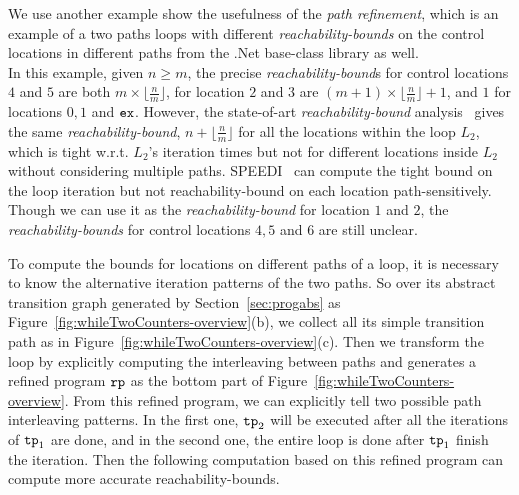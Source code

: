 \begin{example}
  \label{ex:twoCounterWhile}
  
  We use another example show the usefulness of the \emph{path refinement}, which is an example of a two paths loops
  with different \emph{reachability-bounds} on the control locations in different paths from the .Net base-class library as well.
  \\
In this example, given $n \geq m$,
the precise \emph{reachability-bound}s for control locations $4$ and $5$ are both $m \times \lfloor\frac{n}{m}\rfloor$,
for location $2$ and $3$ are $(m + 1) \times \lfloor\frac{n}{m}\rfloor + 1$, 
and $1$ for locations $0, 1$ and $\mathtt{ex}$. 
However, the state-of-art \emph{reachability-bound} analysis~\cite{GulwaniZ10}
gives the same \emph{reachability-bound}, $n + \lfloor\frac{n}{m}\rfloor$ for all the locations within the loop $L_2$, which is tight w.r.t. $L_2$'s iteration times but not for different locations inside $L_2$ without considering multiple paths.
SPEEDI~\cite{GulwaniJK09} can compute the tight bound on the loop iteration but not reachability-bound on each location path-sensitively.
Though we can use it as the \emph{reachability-bound} for location $1$ and $2$,
the \emph{reachability-bounds} for control locations $4, 5$ and $6$ are still unclear.

To compute the bounds for locations on different paths of a loop, it is necessary to know the alternative iteration patterns of the two paths.
So over its abstract transition graph generated by Section~\ref{sec:progabs} as Figure~\ref{fig:whileTwoCounters-overview}(b), we collect all its simple transition path as in Figure~\ref{fig:whileTwoCounters-overview}(c).
Then we transform the loop by explicitly computing the interleaving between paths and
generates a refined program $\mathtt{rp}$ as the bottom part of Figure~\ref{fig:whileTwoCounters-overview}.
From this refined program, we can explicitly tell two possible path interleaving patterns.
In the first one, $\mathtt{tp}_2$ will be executed after all the iterations of $\mathtt{tp}_1$ are done, and in the second one,
the entire loop is done after $\mathtt{tp}_1$ finish the iteration.
Then the following computation based on this refined program can compute more accurate reachability-bounds.
\end{example}
